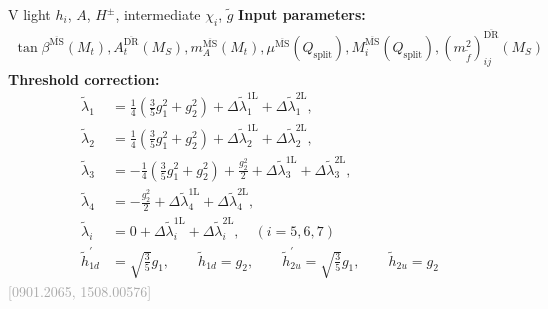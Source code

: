 \documentclass[hyperref={pdfpagelabels=false},ngerman]{beamer}
\newcommand{\MS}{\ensuremath{M_S}}
\newcommand{\bigcite}[1]{\textcolor{darkgray}{[#1]}}
\renewcommand{\emph}{\textbf}
\newcommand{\DRbar}{\ensuremath{\overline{\text{DR}}}}
\newcommand{\MSbar}{\ensuremath{\overline{\text{MS}}}}
\newcommand{\Qsplit}{\ensuremath{Q_\text{split}}\xspace}
\newcommand{\DlSplitTHDM}[2]{\Delta\tilde\lambda_{#1}^{\text{#2L}}}
\newcommand{\gSplitTHDM}[1]{\ensuremath{\tilde{h}_{#1}}}
\newcommand{\gpSplitTHDM}[1]{\ensuremath{\tilde{h}_{#1}^{\prime}}}
\begin{document}
\begin{frame}[noframenumbering]{V light $h_i$, $A$, $H^{\pm}$, intermediate $\chi_i$, $\tilde{g}$}
  \emph{Input parameters:}
  \begin{align*}
  \tan\beta^{\MSbar}(M_t), A_t^{\DRbar}(\MS), m_A^{\MSbar}(M_t),
  \mu^{\MSbar}(\Qsplit), M_i^{\MSbar}(\Qsplit),
  (m_{\tilde{f}}^2)^{\DRbar}_{ij}(\MS)
  \end{align*}
  \emph{Threshold correction:}
  \begin{align*}
    \tilde\lambda_1 &= \frac{1}{4}\left(\frac{3}{5} g_1^2 + g_2^2\right) + \DlSplitTHDM{1}{1} + \DlSplitTHDM{1}{2},\\
    \tilde\lambda_2 &= \frac{1}{4}\left(\frac{3}{5} g_1^2 + g_2^2\right) + \DlSplitTHDM{2}{1} + \DlSplitTHDM{2}{2},\\
    \tilde\lambda_3 &= -\frac{1}{4} \left(\frac{3}{5}g_1^2 + g_2^2\right) + \frac{g_2^2}{2} + \DlSplitTHDM{3}{1} + \DlSplitTHDM{3}{2},\\
    \tilde\lambda_4 &= -\frac{g_2^2}{2} + \DlSplitTHDM{4}{1} + \DlSplitTHDM{4}{2},\\
    \tilde\lambda_i &= 0 + \DlSplitTHDM{i}{1} + \DlSplitTHDM{i}{2}, \quad (i = 5,6,7)\\
    \gpSplitTHDM{1d} &= \sqrt{\frac{3}{5}} g_1, \qquad
    \gSplitTHDM{1d}  = g_2, \qquad
    \gpSplitTHDM{2u} = \sqrt{\frac{3}{5}} g_1, \qquad
    \gSplitTHDM{2u}  = g_2
  \end{align*}
  \hfill\bigcite{0901.2065, 1508.00576}
\end{frame}
\end{document}
